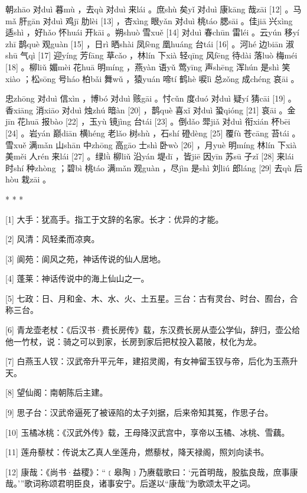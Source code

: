\documentclass[12pt,UTF8]{ctexbook}
\begin{document}
朝zhāo 对duì 暮mù ，去qù 对duì 来lái 。庶shù 矣yǐ 对duì 康kāng 哉zāi [12] 。马mǎ 肝gān 对duì 鸡jī 肋lèi [13] ，杏xìng 眼yǎn 对duì 桃táo 腮sāi 。佳jiā 兴xìng 适shì ，好hǎo 怀huái 开kāi 。朔shuò 雪xuě [14] 对duì 春chūn 雷léi 。云yún 移yí zhī 鹊què 观guàn [15] ，日rì 晒shài 凤fèng 凰huáng 台tái [16] 。河hé 边biān 淑shū 气qì [17] 迎yíng 芳fāng 草cǎo ，林lín 下xià 轻qīng 风fēng 待dài 落luò 梅méi [18] 。柳liǔ 媚mèi 花huā 明míng ，燕yàn 语yǔ 莺yīng 声shēng 浑hún 是shì 笑xiào ；松sōng 号háo 柏bǎi 舞wǔ ，猿yuán 啼tí 鹤hè 唳lì 总zǒng 成chéng 哀āi 。

忠zhōng 对duì 信xìn ，博bó 对duì 赅gāi 。忖cǔn 度duó 对duì 疑yí 猜cāi [19] 。香xiāng 消xiāo 对duì 烛zhú 暗àn [20] ，鹊què 喜xǐ 对duì 蛩qióng [21] 哀āi 。金jīn 花huā 报bào [22] ，玉yù 镜jìng 台tái [23] 。倒dǎo 斝jiǎ 对duì 衔xián 杯bēi [24] 。岩yán 巅diān 横héng 老lǎo 树shù ，石shí 磴dèng [25] 覆fù 苍cāng 苔tái 。雪xuě 满mǎn 山shān 中zhōng 高gāo 士shì 卧wò [26] ，月yuè 明míng 林lín 下xià 美měi 人rén 来lái [27] 。绿lǜ 柳liǔ 沿yán 堤dī ，皆jiē 因yīn 苏sū 子zǐ [28] 来lái 时shí 种zhòng ；碧bì 桃táo 满mǎn 观guàn ，尽jìn 是shì 刘liú 郎láng [29] 去qù 后hòu 栽zāi 。



* * *



[1] 大手：犹高手。指工于文辞的名家。长才：优异的才能。

[2] 风清：风轻柔而凉爽。

[3] 阆苑：阆风之苑，神话传说的仙人居地。

[4] 蓬莱：神话传说中的海上仙山之一。

[5] 七政：日、月和金、木、水、火、土五星。三台：古有灵台、时台、囿台，合称三台。

[6] 青龙壶老杖：《后汉书·费长房传》载，东汉费长房从壶公学仙，辞归，壶公给他一竹杖，说：骑之可以到家，长房到家后把杖投入葛陂，杖化为龙。

[7] 白燕玉人钗：汉武帝升平元年，建招灵阁，有女神留玉钗与帝，后化为玉燕升天。

[8] 望仙阁：南朝陈后主建。

[9] 思子台：汉武帝逼死了被诬陷的太子刘据，后来帝知其冤，作思子台。

[10] 玉橘冰桃：《汉武外传》载，王母降汉武宫中，享帝以玉橘、冰桃、雪藕。

[11] 莲舟藜杖：传说太乙真人坐莲舟，燃藜杖，降天禄阁，照刘向读书。

[12] 康哉：《尚书·益稷》：“﹝皋陶﹞乃赓载歌曰：‘元首明哉，股肱良哉，庶事康哉。’”歌词称颂君明臣良，诸事安宁。后遂以“康哉”为歌颂太平之词。
\end{document}
